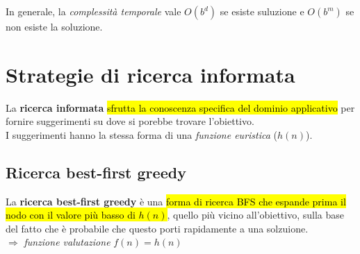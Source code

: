 \documentclass[12pt, a4paper, oneside]{book}
\begin{document}
    In generale, la \textit{complessità temporale} vale $O(b^d)$ se esiste suluzione e $O(b^m)$ se non esiste la soluzione. \\[2ex]

    \begin{center}
    \end{center}


    \section{Strategie di ricerca informata}
    La \textbf{ricerca informata} \hl{sfrutta la conoscenza specifica del dominio applicativo} per fornire suggerimenti su dove si porebbe trovare l'obiettivo. \\[0.2ex]
    I suggerimenti hanno la stessa forma di una \textit{funzione euristica} ($h(n)$).


    \subsection{Ricerca best-first greedy}
    La \textbf{ricerca best-first greedy} è una \hl{forma di ricerca BFS che espande prima il nodo con il valore più basso di $h(n)$}, quello più vicino all'obiettivo, sulla base del fatto che è probabile che questo porti rapidamente a una solzuione. \\[0.2ex]
    $\Rightarrow$ \textit{funzione valutazione} $f(n) = h(n)$
\end{document}
